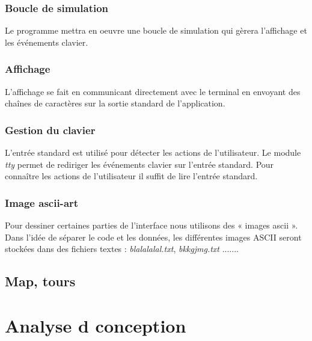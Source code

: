\documentclass{article}
\begin{document}
            \subsubsection{Boucle de simulation}
            Le programme mettra en oeuvre une boucle de simulation qui gèrera l'affichage et les
événements clavier.

            \subsubsection{Affichage}
            L'affichage se fait en communicant directement avec le terminal en envoyant des chaînes de
caractères sur la sortie standard de l'application.

            \subsubsection{Gestion du clavier}
            L'entrée standard est utilisé pour détecter les actions de l'utilisateur.
Le module \emph{tty} permet de rediriger les événements clavier sur l'entrée standard.
Pour connaître les actions de l'utilisateur il suffit de lire l'entrée standard.

            \subsubsection{Image ascii-art}
            Pour dessiner certaines parties de l'interface nous utilisons des « images ascii ».
Dans l'idée de séparer le code et les données, les différentes images ASCII seront stockées
dans des fichiers textes : \emph{blalalalal.txt}, \emph{bkkgjmg.txt} .......

        \subsection{Map, tours}
    \section{Analyse d conception}
\end{document}
